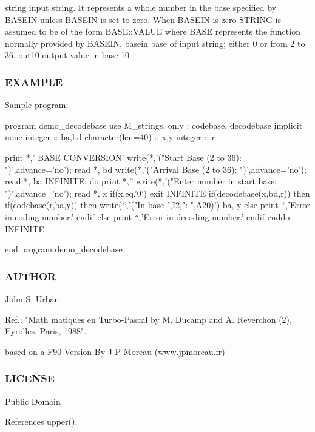 string input string. It represents a whole number in the base specified by B\+A\+S\+E\+IN unless B\+A\+S\+E\+IN is set to zero. When B\+A\+S\+E\+IN is zero S\+T\+R\+I\+NG is assumed to be of the form B\+A\+S\+E\+::\+V\+A\+L\+UE where B\+A\+SE represents the function normally provided by B\+A\+S\+E\+IN. basein base of input string; either 0 or from 2 to 36. out10 output value in base 10

\subsubsection*{E\+X\+A\+M\+P\+LE}

\begin{DoxyVerb}Sample program:

 program demo_decodebase
 use M_strings, only : codebase, decodebase
 implicit none
 integer           :: ba,bd
 character(len=40) :: x,y
 integer           :: r

 print *,' BASE CONVERSION'
 write(*,'("Start   Base (2 to 36): ")',advance='no'); read *, bd
 write(*,'("Arrival Base (2 to 36): ")',advance='no'); read *, ba
 INFINITE: do
    print *,''
    write(*,'("Enter number in start base: ")',advance='no'); read *, x
    if(x.eq.'0') exit INFINITE
    if(decodebase(x,bd,r)) then
       if(codebase(r,ba,y)) then
         write(*,'("In base ",I2,": ",A20)')  ba, y
       else
         print *,'Error in coding number.'
       endif
    else
       print *,'Error in decoding number.'
    endif
 enddo INFINITE

 end program demo_decodebase
\end{DoxyVerb}


\subsubsection*{A\+U\+T\+H\+OR}

John S. Urban

Ref.\+: "Math matiques en Turbo-\/\+Pascal by M. Ducamp and A. Reverchon (2), Eyrolles, Paris, 1988".

based on a F90 Version By J-\/P Moreau (www.\+jpmoreau.\+fr)

\subsubsection*{L\+I\+C\+E\+N\+SE}

Public Domain 

References upper().


